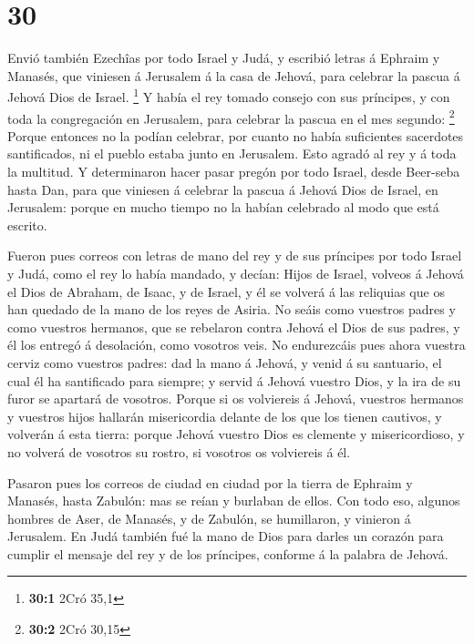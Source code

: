 \hypertarget{section-29}{%
\section{30}\label{section-29}}

 Envió también Ezechîas por todo Israel y Judá, y escribió
letras á Ephraim y Manasés, que viniesen á Jerusalem á la casa de
Jehová, para celebrar la pascua á Jehová Dios de Israel. \footnote{\textbf{30:1}
  2Cró 35,1}  Y había el rey tomado consejo con sus
príncipes, y con toda la congregación en Jerusalem, para celebrar la
pascua en el mes segundo: \footnote{\textbf{30:2} 2Cró 30,15}
 Porque entonces no la podían celebrar, por cuanto no
había suficientes sacerdotes santificados, ni el pueblo estaba junto en
Jerusalem.  Esto agradó al rey y á toda la multitud.
 Y determinaron hacer pasar pregón por todo Israel, desde
Beer-seba hasta Dan, para que viniesen á celebrar la pascua á Jehová
Dios de Israel, en Jerusalem: porque en mucho tiempo no la habían
celebrado al modo que está escrito.

 Fueron pues correos con letras de mano del rey y de sus
príncipes por todo Israel y Judá, como el rey lo había mandado, y
decían: Hijos de Israel, volveos á Jehová el Dios de Abraham, de Isaac,
y de Israel, y él se volverá á las reliquias que os han quedado de la
mano de los reyes de Asiria.  No seáis como vuestros
padres y como vuestros hermanos, que se rebelaron contra Jehová el Dios
de sus padres, y él los entregó á desolación, como vosotros veis.
 No endurezcáis pues ahora vuestra cerviz como vuestros
padres: dad la mano á Jehová, y venid á su santuario, el cual él ha
santificado para siempre; y servid á Jehová vuestro Dios, y la ira de su
furor se apartará de vosotros.  Porque si os volviereis á
Jehová, vuestros hermanos y vuestros hijos hallarán misericordia delante
de los que los tienen cautivos, y volverán á esta tierra: porque Jehová
vuestro Dios es clemente y misericordioso, y no volverá de vosotros su
rostro, si vosotros os volviereis á él.

 Pasaron pues los correos de ciudad en ciudad por la
tierra de Ephraim y Manasés, hasta Zabulón: mas se reían y burlaban de
ellos.  Con todo eso, algunos hombres de Aser, de
Manasés, y de Zabulón, se humillaron, y vinieron á Jerusalem.
 En Judá también fué la mano de Dios para darles un
corazón para cumplir el mensaje del rey y de los príncipes, conforme á
la palabra de Jehová.

